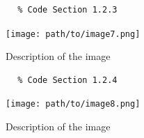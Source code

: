\documentclass{article}
\begin{document}
\begin{enumerate}
\begin{enumerate}[label*=\arabic*.]
        \begin{verbatim}
        % Code Section 1.2.3
        \end{verbatim}

        \begin{figure}[h]
            \centering
            \texttt{[image: path/to/image7.png]}
            \caption{Description of the image}
            \label{fig:image7}
        \end{figure}

        \begin{verbatim}
        % Code Section 1.2.4
        \end{verbatim}

        \begin{figure}[h]
            \centering
            \texttt{[image: path/to/image8.png]}
            \caption{Description of the image}
            \label{fig:image8}
        \end{figure}

    \end{enumerate}

\end{enumerate}
\end{document}
